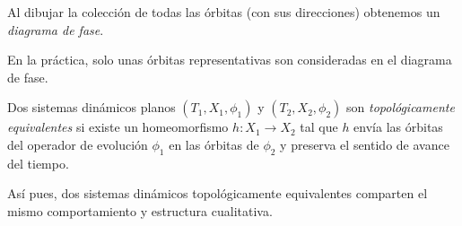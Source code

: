 \begin{definition}
  \label{def:phasediagram}Al dibujar la colecci\'on de todas las \'orbitas
  (con sus direcciones) obtenemos un {\emph{diagrama de fase}}.
\end{definition}
En la pr\'actica, solo unas \'orbitas representativas son consideradas en el diagrama de fase.

\begin{definition} \label{def:topologicalequivalence}
Dos sistemas dinámicos planos $(T_1, X_1, \phi_1)$ y $(T_2, X_2, \phi_2)$ son \emph{topológicamente equivalentes} si existe un homeomorfismo $h: X_1 \to X_2$ tal que $h$ envía las órbitas del operador de evolución $\phi_1$ en las órbitas de $\phi_2$ y preserva el sentido de avance del tiempo.
\end{definition}

Así pues, dos sistemas dinámicos topológicamente equivalentes comparten el mismo comportamiento y estructura cualitativa.


